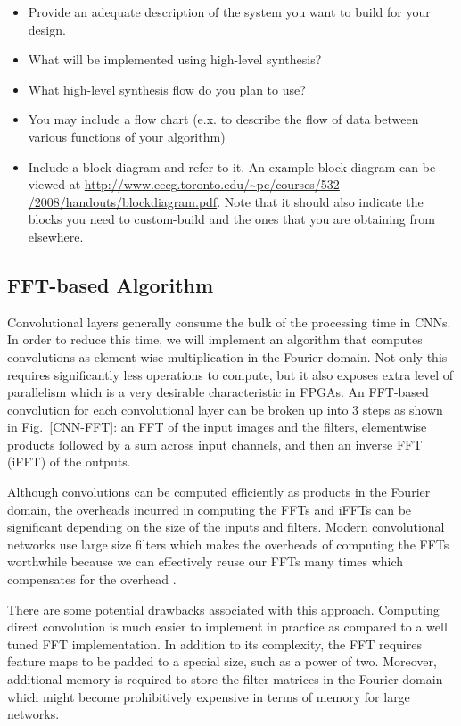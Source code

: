 \documentclass[conference,compsoc]{IEEEtran/IEEEtran}
\begin{document}
\begin{itemize}
\item Provide an adequate description of the system you want to build for your design.
\item What will be implemented using high-level synthesis?
\item What high-level synthesis flow do you plan to use?
\item You may include a flow chart (e.x. to describe the flow of data between various functions of your algorithm)
\item Include a block diagram and refer to it.
An example block diagram can be viewed at \href{http://www.eecg.toronto.edu/~pc/courses/532/2008/handouts/blockdiagram.pdf}{http://www.eecg.toronto.edu/\~{}pc/courses/532 /2008/handouts/blockdiagram.pdf}.
Note that it should also indicate the blocks you need to custom-build and the ones that you are obtaining from elsewhere.
\end{itemize}

\subsection{FFT-based Algorithm}
Convolutional layers generally consume the bulk of the processing time in CNNs. In order to reduce this time, we will implement an algorithm that computes convolutions as element wise multiplication in the Fourier domain. Not only this requires significantly less operations to compute, but it also exposes extra level of parallelism which is a very desirable characteristic in FPGAs. An FFT-based convolution for each convolutional layer can be broken up into $3$ steps as shown in Fig.~\ref{CNN-FFT}: an FFT of the input images and the filters, elementwise products followed by a sum across input channels, and then an inverse FFT (iFFT) of the outputs.

Although convolutions can be computed efficiently as products in the Fourier domain, the overheads incurred in computing the FFTs and iFFTs can be significant depending on the size of the inputs and filters. Modern convolutional networks use large size filters which makes the overheads of computing the FFTs worthwhile because we can effectively reuse our FFTs many times which compensates for the overhead \cite{FFT1}.

There are some potential drawbacks associated with this approach. Computing direct convolution is much easier to implement in practice as compared to a well tuned FFT implementation. In addition to its complexity, the FFT requires feature maps to be padded to a special size, such as a power of two. Moreover, additional memory is required to store the filter matrices in the Fourier domain which might become prohibitively expensive in terms of memory for large networks.
\end{document}

